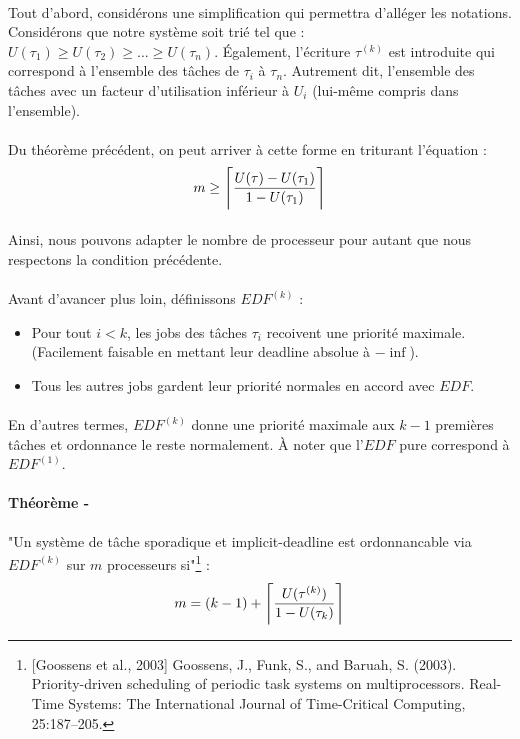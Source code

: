 \paragraph{}
Tout d'abord, considérons une simplification qui permettra d'alléger les notations. Considérons que notre système soit trié tel que : $U(\tau_{1}) \geq U(\tau_{2}) \geq ... \geq U(\tau_{n})$. Également, l'écriture $\tau^{(k)}$ est introduite qui correspond à l'ensemble des tâches de $\tau_{i}$ à $\tau_{n}$. Autrement dit, l'ensemble des tâches avec un facteur d'utilisation inférieur à $U_{i}$ (lui-même compris dans l'ensemble).

\paragraph{}
Du théorème précédent, on peut arriver à cette forme en triturant l'équation : 
\begin{equation}
m \geq \ceil[\Bigg]{\frac{U(\tau) - U(\tau_{1})}{1 - U(\tau_{1})}}
\end{equation}

\paragraph{}
Ainsi, nous pouvons adapter le nombre de processeur pour autant que nous respectons la condition précédente.

\paragraph{} Avant d'avancer plus loin, définissons $EDF^{(k)}$ : 
\begin{itemize}
\item Pour tout $i < k$, les jobs des tâches $\tau_{i}$ recoivent une priorité maximale. (Facilement faisable en mettant leur deadline absolue à $-\inf$).
\item Tous les autres jobs gardent leur priorité normales en accord avec $EDF$.
\end{itemize}

\paragraph{}
En d'autres termes,  $EDF^{(k)}$ donne une priorité maximale aux $k-1$ premières tâches et ordonnance le reste normalement. À noter que l'$EDF$ pure correspond à $EDF^{(1)}$.

\paragraph{Théorème - } "Un système de tâche sporadique et implicit-deadline est ordonnancable via $EDF^{(k)}$ sur $m$ processeurs si"\footnote{[Goossens et al., 2003] Goossens, J., Funk, S., and Baruah, S. (2003).
Priority-driven scheduling of periodic task systems on
multiprocessors.
Real-Time Systems: The International Journal of Time-Critical
Computing, 25:187–205.} : 
\begin{equation}
m = (k-1) + \ceil[\Bigg]{\frac{U(\tau^{(k)})}{1 - U(\tau_{k})}}
\end{equation}
